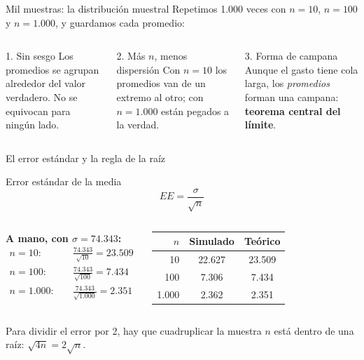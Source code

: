 \documentclass[aspectratio=169,10pt]{beamer}
\begin{document}
\begin{frame}{Mil muestras: la distribución muestral}
Repetimos 1.000 veces con $n = 10$, $n = 100$ y $n = 1.000$, y guardamos cada promedio:

\begin{columns}[T]
\begin{block}{1. Sin sesgo}
Los promedios se agrupan alrededor del valor verdadero. No se equivocan para ningún lado.
\end{block}
\begin{block}{2. Más $n$, menos dispersión}
Con $n=10$ los promedios van de un extremo al otro; con $n=1.000$ están pegados a la verdad.
\end{block}
\begin{block}{3. Forma de campana}
Aunque el gasto tiene cola larga, los \emph{promedios} forman una campana: \textbf{teorema central del límite}.
\end{block}
\end{columns}
\end{frame}

\begin{frame}{El error estándar y la regla de la raíz}
\begin{block}{Error estándar de la media}
\[
EE = \frac{\sigma}{\sqrt{n}}
\]
\end{block}

\begin{columns}[T]
\textbf{A mano, con $\sigma = 74.343$:}
\[
\begin{aligned}
n = 10:   &\quad \frac{74.343}{\sqrt{10}}   = 23.509 \\[2pt]
n = 100:  &\quad \frac{74.343}{\sqrt{100}}  = 7.434 \\[2pt]
n = 1.000:&\quad \frac{74.343}{\sqrt{1.000}} = 2.351
\end{aligned}
\]
\begin{center}
\small
\begin{tabular}{rcc}
\toprule
$n$ & \textbf{Simulado} & \textbf{Teórico} \\
\midrule
10 & 22.627 & 23.509 \\
100 & 7.306 & 7.434 \\
1.000 & 2.362 & 2.351 \\
\bottomrule
\end{tabular}
\end{center}
\end{columns}
\vspace{0.2cm}
\begin{alertblock}{Para dividir el error por 2, hay que cuadruplicar la muestra}
$n$ está dentro de una raíz: $\sqrt{4n} = 2\sqrt{n}$.
\end{alertblock}
\end{frame}
\end{document}
